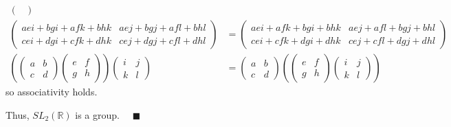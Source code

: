 \documentclass[12pt]{article}
\newcommand{\R}{\mathbb{R}}
\newcommand{\qed}{\quad \blacksquare}
\begin{document}
\begin{align*}
\begin{pmatrix}
    \end{pmatrix}\\
    \begin{pmatrix}
        aei + bgi + afk + bhk & aej + bgj + afl + bhl\\
        cei + dgi + cfk + dhk & cej + dgj + cfl + dhl
    \end{pmatrix} &= \begin{pmatrix}
        aei + afk + bgi + bhk & aej + afl + bgj + bhl\\
        cei + cfk + dgi + dhk & cej + cfl + dgj + dhl
    \end{pmatrix}\\
    \left(\begin{pmatrix}
        a & b\\
        c & d
    \end{pmatrix}\begin{pmatrix}
        e & f\\
        g & h
    \end{pmatrix}\right) \begin{pmatrix}
        i & j\\
        k & l
    \end{pmatrix} &= \begin{pmatrix}
        a & b\\
        c & d
    \end{pmatrix}\left(\begin{pmatrix}
        e & f\\
        g & h
    \end{pmatrix} \begin{pmatrix}
        i & j\\
        k & l
    \end{pmatrix}\right)
\end{align*}
so associativity holds.

Thus, $SL_2(\R)$ is a group. $\qed$
\color{black}
\pagebreak
\end{document}

